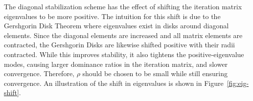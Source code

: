 
The diagonal stabilization scheme has the effect of shifting the iteration matrix eigenvalues to be more positive. The intuition for this shift is due to the Gershgorin Disk Theorem where eigenvalues exist in disks around diagonal elements. Since the diagonal elements are increased and all matrix elements are contracted, the Gershgorin Disks are likewise shifted positive with their radii contracted. While this improves stability, it also tightens the positive-eigenvalue modes, causing larger dominance ratios in the iteration matrix, and slower convergence. Therefore, $\rho$ should be chosen to be small while still ensuring convergence. An illustration of the shift in eigenvalues is shown in Figure~\ref{fig:eig-shift}.
	
